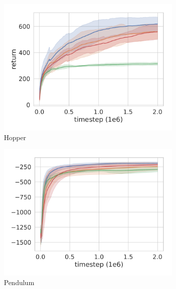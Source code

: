 \documentclass{article}
\begin{document}
\begin{figure}
  \begin{subfigure}[b]{0.25\textwidth}
    \includegraphics[width=\textwidth]{Hopper-v2.pdf}
    \caption{Hopper}
  \end{subfigure}%
  \begin{subfigure}[b]{0.25\textwidth}
    \includegraphics[width=\textwidth]{Pendulum-v0.pdf}
    \caption{Pendulum}
  \end{subfigure}%
  \begin{subfigure}[b]{0.25\textwidth}

\end{subfigure}
\end{figure}
\end{document}
